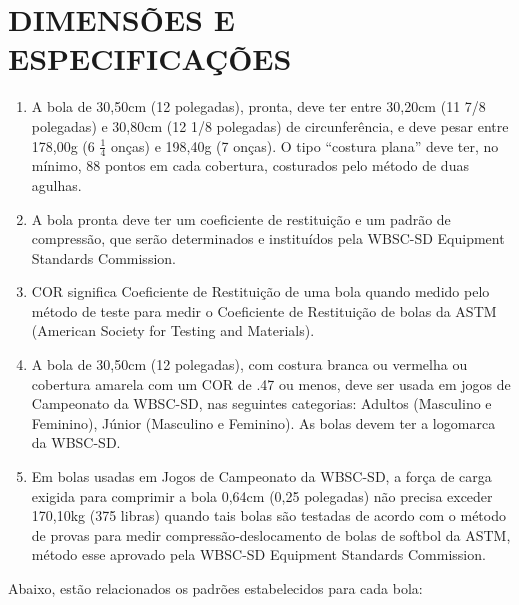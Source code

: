 \section{DIMENSÕES E ESPECIFICAÇÕES}
\begin{multicols}{2} 
	\begin{enumerate}[label= \arabic*)]
		\item  A bola de 30,50cm (12 polegadas), pronta, deve ter entre 30,20cm (11 7/8 
		polegadas) e 30,80cm (12 1/8 polegadas) de circunferência, e deve pesar entre 
		178,00g (6 $\frac{1}{4}$ onças) e 198,40g (7 onças). O tipo “costura plana” deve ter, no mínimo, 
		88 pontos em cada cobertura, costurados pelo método de duas agulhas. 
		\item  A bola pronta deve ter um coeficiente de restituição e um padrão de compressão, 
		que serão determinados e instituídos pela WBSC-SD Equipment Standards 
		Commission. 
		\item  COR significa Coeficiente de Restituição de uma bola quando medido pelo método 
		de teste para medir o Coeficiente de Restituição de bolas da ASTM (American Society 
		for Testing and Materials). 
		\item  A bola de 30,50cm (12 polegadas), com costura branca ou vermelha ou cobertura 
		amarela com um COR de .47 ou menos, deve ser usada em jogos de Campeonato da 
		WBSC-SD, nas seguintes categorias: Adultos (Masculino e Feminino), Júnior (Masculino 
		e Feminino). As bolas devem ter a logomarca da WBSC-SD. 
		\item  Em bolas usadas em Jogos de Campeonato da WBSC-SD, a força de carga exigida 
		para comprimir a bola 0,64cm (0,25 polegadas) não precisa exceder 170,10kg (375 libras) quando tais bolas são testadas de acordo com o método de provas para medir compressão-deslocamento de bolas de softbol da ASTM, método esse aprovado pela WBSC-SD Equipment Standards Commission. 
	\end{enumerate}
\end{multicols}
Abaixo, estão relacionados os padrões estabelecidos para cada bola: 



